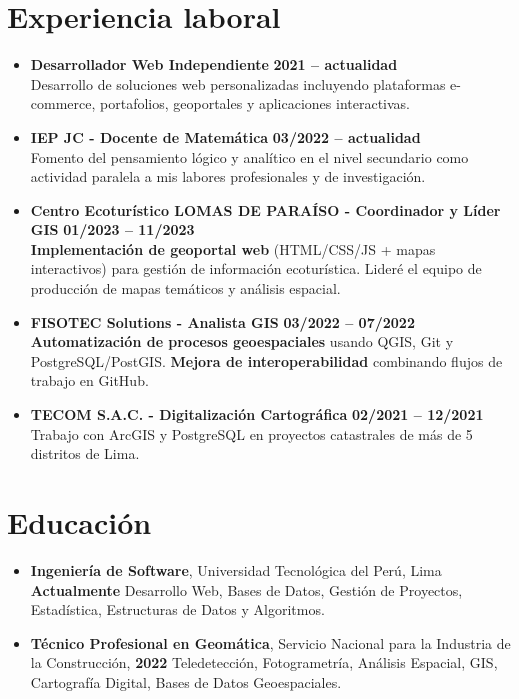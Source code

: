 \documentclass[11pt,a4paper]{article}
\begin{document}
\section*{Experiencia laboral}
\begin{itemize}[left=15pt]
  \item \textbf{Desarrollador Web Independiente} \hfill \textbf{2021 -- actualidad}\\
    Desarrollo de soluciones web personalizadas incluyendo plataformas e-commerce, portafolios, geoportales y aplicaciones interactivas.
  \item \textbf{IEP JC - Docente de Matemática} \hfill \textbf{03/2022 -- actualidad}\\
    Fomento del pensamiento lógico y analítico en el nivel secundario como actividad paralela a mis labores profesionales y de investigación.
  \item \textbf{Centro Ecoturístico LOMAS DE PARAÍSO - Coordinador y Líder GIS} \hfill \textbf{01/2023 -- 11/2023}\\
    \textbf{Implementación de geoportal web} (HTML/CSS/JS + mapas interactivos) para gestión de información ecoturística. Lideré el equipo de producción de mapas temáticos y análisis espacial.
  \item \textbf{FISOTEC Solutions - Analista GIS} \hfill \textbf{03/2022 -- 07/2022}\\
    \textbf{Automatización de procesos geoespaciales} usando QGIS, Git y PostgreSQL/PostGIS. \textbf{Mejora de interoperabilidad} combinando flujos de trabajo en GitHub.
  \item \textbf{TECOM S.A.C. - Digitalización Cartográfica} \hfill \textbf{02/2021 -- 12/2021}\\
    Trabajo con ArcGIS y PostgreSQL en proyectos catastrales de más de 5 distritos de Lima.
\end{itemize}
\vspace{-0.5cm}
\section*{Educación}
\begin{itemize}[left=15pt]
  \item \textbf{Ingeniería de Software}, Universidad Tecnológica del Perú, Lima \hfill \textbf{Actualmente}
  \vspace{-0.3cm}
  \subitem Desarrollo Web, Bases de Datos, Gestión de Proyectos, Estadística, Estructuras de Datos y Algoritmos.
  \item \textbf{Técnico Profesional en Geomática}, Servicio Nacional para la Industria de la Construcción, \hfill \textbf{2022}
  \vspace{-0.3cm}
  \subitem Teledetección, Fotogrametría, Análisis Espacial, GIS, Cartografía Digital, Bases de Datos Geoespaciales.
\end{itemize}
\vspace{-0.2cm}
\end{document}
